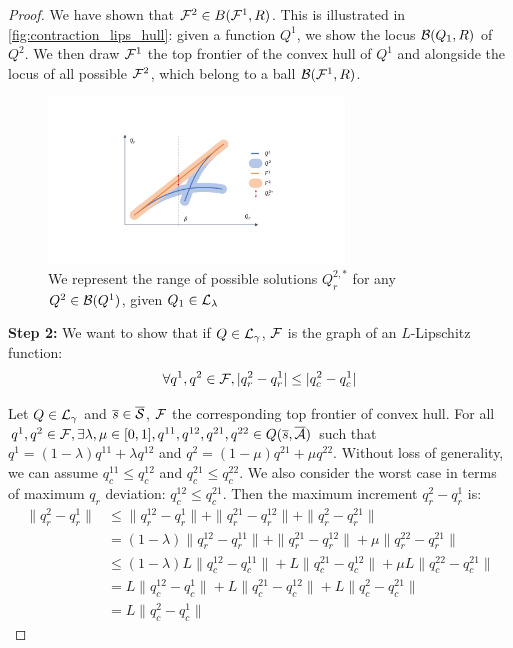 \begin{subappendices}
\begin{proof}
	
	We have shown that $\mathcal{F}^2 \in B(\mathcal{F}^1, R)$.
	This is illustrated in \autoref{fig:contraction_lips_hull}: given a function $Q^1$, we show the locus $\mathcal{B}(Q_1,R)$ of $Q^2$. We then draw $\mathcal{F}^1$ the top frontier of the convex hull of $Q^1$ and alongside the locus of all possible $\mathcal{F}^2$, which belong to a ball $\mathcal{B}(\mathcal{F}^1, R)$. 
	
	\begin{figure}[ht]
		\centering
		\includegraphics[trim=7cm 4cm 7cm 4cm, clip, width=0.7\textwidth]{img/contraction_lipschitz.pdf}
		\caption{We represent the range of possible solutions $Q_r^{2,*}$ for any $Q^2\in\mathcal{B}(Q^1)$, given $Q_1\in\mathcal{L}_\lambda$}
		\label{fig:contraction_lips_hull}
	\end{figure}
	
	\textbf{Step 2:} We want to show that if $Q\in\mathcal{L}_\gamma$, $\mathcal{F}$ is the graph of an $L$-Lipschitz function:
	\begin{equation}
	\label{eq:L-lip-set}
	\forall q^1,q^2\in\mathcal{F}, |q_r^2-q_r^1| \leq |q_c^2-q_c^1|
	\end{equation}
	
	Let $Q\in\mathcal{L}_\gamma$ and $\overline{s}\in\overline{\mathcal{S}}$, $\mathcal{F}$ the corresponding top frontier of convex hull.
	For all $q^1,q^2\in\mathcal{F}, \exists \lambda,\mu\in[0,1], q^{11},q^{12},q^{21},q^{22}\in Q(\overline{s},\overline{\mathcal{A}})$ such that $q^1 = (1-\lambda)q^{11} + \lambda q^{12}$ and $q^2 = (1-\mu)q^{21} + \mu q^{22}$.
	Without loss of generality, we can assume $q_c^{11}\leq q_c^{12}$ and $q_c^{21}\leq q_c^{22}$. We also consider the worst case in terms of maximum $q_r$ deviation: $q_c^{12} \leq q_c^{21}$.
	Then the maximum increment $q_r^2-q_r^{1}$ is:
	\begin{align*}
	\|q^2_r-q^{1}_r\| &\leq \|q^{12}_r-q^{1}_r\| + \|q^{21}_r-q^{12}_r\| + \|q^{2}_r-q^{21}_r\| \\
	&= (1-\lambda)\|q^{12}_r-q^{11}_r\| + \|q^{21}_r-q^{12}_r\| + \mu\|q^{22}_r-q^{21}_r\| \\ 
	&\leq (1-\lambda)L\|q^{12}_c-q^{11}_c\| + L\|q^{21}_c-q^{12}_c\| + \mu L\|q^{22}_c-q^{21}_c\| \\
	&= L\|q^{12}_c-q^{1}_c\| + L\|q^{21}_c-q^{12}_c\| + L\|q^{2}_c-q^{21}_c\|\\
	&= L\|q^{2}_c-q^{1}_c\|
	\end{align*}
	

\end{proof}
\end{subappendices}

